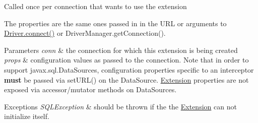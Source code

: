 Called once per connection that wants to use the extension

The properties are the same ones passed in in the U\+RL or arguments to \mbox{\hyperlink{classcom_1_1mysql_1_1jdbc_1_1_non_registering_driver_a834c012e752a01d1ee435b3461bb8218}{Driver.\+connect()}} or Driver\+Manager.\+get\+Connection().


\begin{DoxyParams}{Parameters}
{\em conn} & the connection for which this extension is being created \\
\hline
{\em props} & configuration values as passed to the connection. Note that in order to support javax.\+sql.\+Data\+Sources, configuration properties specific to an interceptor {\bfseries must} be passed via set\+U\+R\+L() on the Data\+Source. \mbox{\hyperlink{interfacecom_1_1mysql_1_1jdbc_1_1_extension}{Extension}} properties are not exposed via accessor/mutator methods on Data\+Sources.\\
\hline
\end{DoxyParams}

\begin{DoxyExceptions}{Exceptions}
{\em S\+Q\+L\+Exception} & should be thrown if the the \mbox{\hyperlink{interfacecom_1_1mysql_1_1jdbc_1_1_extension}{Extension}} can not initialize itself. \\
\hline
\end{DoxyExceptions}


